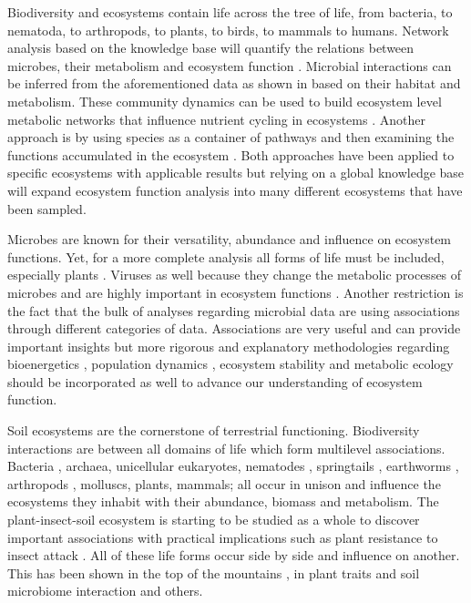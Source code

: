 Biodiversity and ecosystems contain life across the tree of life, from
bacteria, to nematoda, to arthropods, to plants, to birds, to mammals to 
humans. Network analysis based on the knowledge base will quantify the relations
between microbes, their metabolism and ecosystem
function \parencite{graham2016Microbes,muller2018Using, perez_garcia2016Metabolic}.
Microbial interactions can be inferred from the aforementioned data as shown
in \parencite{machado2021Polarization} based on their habitat and metabolism.
These community dynamics can be used to build ecosystem level metabolic
networks \parencite{perez_garcia2016Metabolic} that influence nutrient cycling in
ecosystems \parencite{bauer2018Network}. Another approach is by using species as a
container of pathways and then examining the functions accumulated in the
ecosystem \parencite{loucaDecouplingFunctionTaxonomy2016}. Both approaches have
been applied to specific ecosystems with applicable results but relying on a
global knowledge base will expand ecosystem function analysis into many
different ecosystems that have been sampled.

Microbes are known for their versatility, abundance and influence on ecosystem
functions. Yet, for a more complete analysis all forms of life must be included,
especially plants \parencite{thompson2012Food}. Viruses as well because they
change the metabolic processes of microbes and are highly important in
ecosystem functions \parencite{hurwitz2016Viral}. Another restriction is the fact
that the bulk of analyses regarding microbial data are using associations
through different categories of data. Associations are very useful and can
provide important insights but more rigorous and explanatory methodologies
regarding bioenergetics \parencite{kempes2012Growth}, population dynamics
\parencite{gonze2018Microbial}, ecosystem stability \parencite{berdugo2020Global} and
metabolic ecology \parencite{brown2004METABOLIC} should be incorporated as well to
advance our understanding of ecosystem function.

Soil ecosystems are the cornerstone of terrestrial functioning.
Biodiversity interactions are between all domains of life which form
multilevel associations. Bacteria \parencite{Delgado-Baquerizo-atlas}, archaea,
unicellular eukaryotes, nematodes \parencite{vandenHoogen2019},
springtails \parencite{potapov2023Globally}, earthworms \parencite{Phillips2021},
arthropods \parencite{milo-arthropods}, molluscs, plants, mammals; all occur in unison and 
influence the ecosystems they inhabit with their abundance, biomass \parencite{bar2018biomass} and metabolism.
The plant-insect-soil ecosystem is starting to be studied as a whole to discover
important associations with practical implications such as plant resistance 
to insect attack \parencite{plant-insect-soil2023}.
All of these life forms occur side by side and influence on another. This has been shown in the 
top of the mountains \parencite{winkler2018side}, in plant traits and soil microbiome interaction \parencite{beugnon2022Abiotic} and others. 

